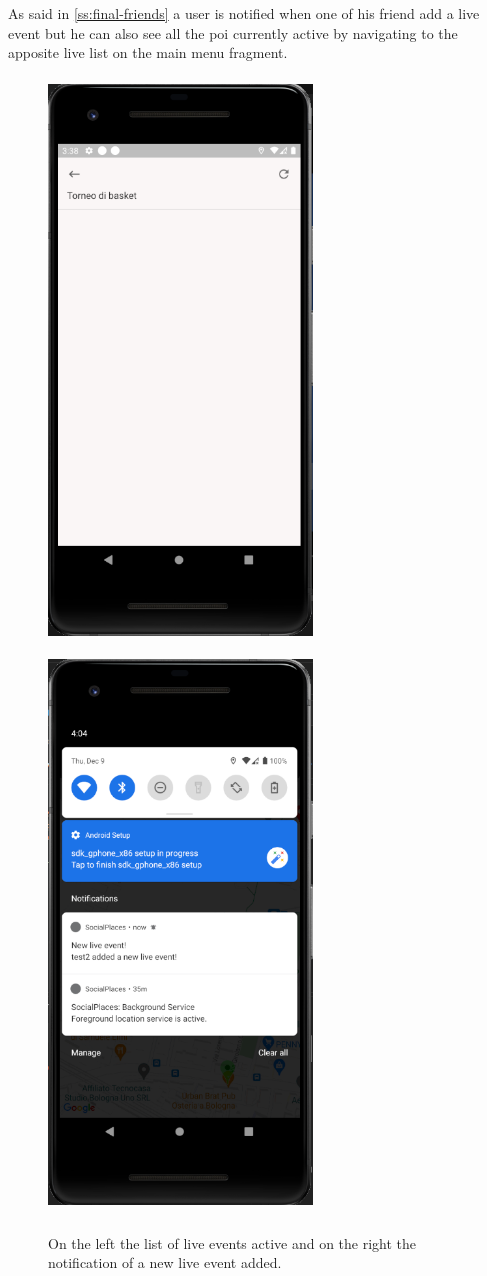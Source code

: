 \documentclass[../../main]{subfiles}
\begin{document}
As said in \ref{ss:final-friends} a user is notified when one of his friend add a live event but he can also see all the poi currently active by navigating
to the apposite live list on the main menu fragment.
\begin{figure}[H]
    \centering
    \includegraphics[width=70mm,height=150mm]{images/app/live/live_overview.png}
    \includegraphics[width=70mm,height=150mm]{images/app/notification/live/notifed_live.png}
    \caption{On the left the list of live events active and on the right the notification of a new live event added.}
\end{figure}
\end{document}
